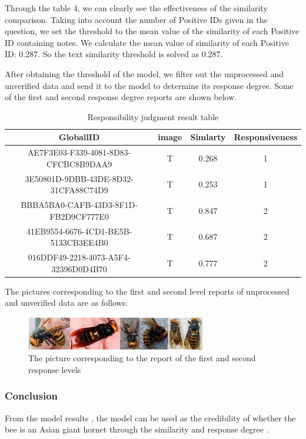 \documentclass{mcmthesis}
\begin{document}
Through the table 4, we can clearly see the effectiveness of the similarity comparison. Taking into account the number of Positive IDs given in the question, we set the threshold to the mean value of the similarity of each Positive ID containing notes. We calculate the mean value of similarity of each Positive ID: 0.287. So the text similarity threshold is solved as 0.287.

After obtaining the threshold of the model, we filter out the unprocessed and unverified data and send it to the model to determine its response degree. Some of the first and second response degree reports are shown below.
\begin{table}[H]   %
	\centering\caption{Responsibility judgment result table}
	\begin{tabular}{cccc}
		\toprule[1.5pt]
GloballID&	image&	Simlarty&	Responsiveness\\
		\midrule[1pt]
{AE7F3E03-F339-4081-8D83-CFCBC8B9DAA9}&	T&	0.268&	1\\
{3E50801D-9DBB-43DE-8D32-31CFA88C74D9}&	T&	0.253&	1\\
{BBBA5BA0-CAFB-43D3-8F1D-FB2D9CF777E0}&	T&	0.847&	2\\
{41EB9554-6676-4CD1-BE5B-5133CB3EE4B0}&	T&	0.687&	2\\
{016DDF49-2218-4073-A5F4-32396D0D4B70}&	T&	0.777&	2\\
		\bottomrule[1.5pt]
\end{tabular}
\end{table}

The pictures corresponding to the first and second level reports of unprocessed and unverified data are as follows:

\begin{figure}[H]
	\centering
	\includegraphics[width=0.7\textwidth]{screenshot019}
	\caption{The picture corresponding to the report of the first and second response levels}
	\label{fig:screenshot019}
\end{figure}

\subsubsection{Conclusion}
From the model results , the model can be used as the credibility of whether the bee is an Asian giant hornet through the similarity and response degree .
\end{document}
